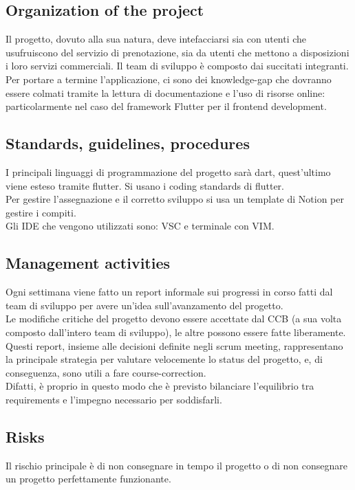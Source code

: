 \documentclass{article}
\begin{document}
\subsection{Organization of the project}
Il progetto, dovuto alla sua natura, deve intefacciarsi sia con utenti  che usufruiscono del servizio di prenotazione, sia da utenti che mettono a disposizioni i loro servizi commerciali.
Il team di sviluppo è composto dai succitati integranti. Per portare a termine l'applicazione, ci sono dei knowledge-gap che dovranno essere colmati tramite la lettura di documentazione e
l'uso di risorse online: particolarmente nel caso del framework Flutter per il frontend development.

\subsection{Standards, guidelines, procedures}
I principali linguaggi di programmazione del progetto sarà dart, quest'ultimo
viene esteso tramite flutter.
Si usano i coding standards di flutter.
\\Per gestire l'assegnazione e il corretto sviluppo si usa un template di Notion per gestire i compiti.
\\Gli IDE che vengono utilizzati sono: VSC e terminale con VIM.

\subsection{Management activities}
Ogni settimana viene fatto un report informale sui progressi in corso fatti dal team di sviluppo per avere un'idea sull'avanzamento del progetto.
\\Le modifiche critiche del progetto devono essere accettate dal CCB (a sua volta composto dall'intero team di sviluppo), le altre possono essere fatte 
liberamente.
\\Questi report, insieme alle decisioni definite negli scrum meeting, rappresentano la principale strategia per valutare velocemente lo status del progetto, e, 
di conseguenza, sono utili a fare course-correction.
\\Difatti, è proprio in questo modo che è previsto bilanciare l’equilibrio tra requirements e l’impegno necessario per soddisfarli.  
\subsection{Risks}
Il rischio principale è di non consegnare in tempo il progetto o di non consegnare un progetto perfettamente funzionante.
\end{document}
